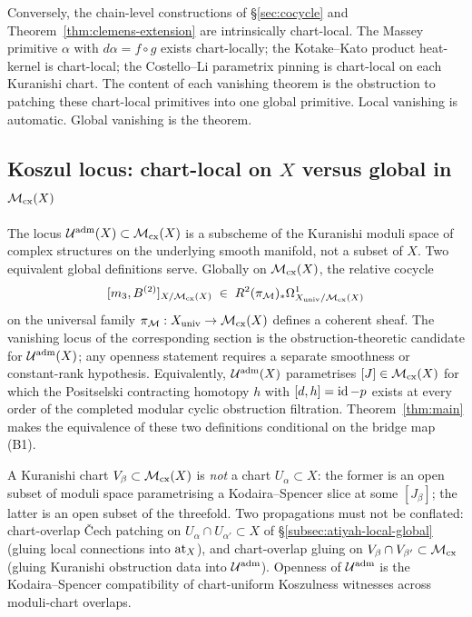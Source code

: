Conversely, the chain-level constructions of §\ref{sec:cocycle} and Theorem~\ref{thm:clemens-extension} are intrinsically chart-local. The Massey primitive $\alpha$ with $d\alpha = f \circ g$ exists chart-locally; the Kotake--Kato product heat-kernel is chart-local; the Costello--Li parametrix pinning is chart-local on each Kuranishi chart. The content of each vanishing theorem is the obstruction to patching these chart-local primitives into one global primitive. Local vanishing is automatic. Global vanishing is the theorem.

\subsection{Koszul locus: chart-local on $X$ versus global in $\mathcal{M}_{\mathrm{cx}}(X)$}
\label{subsec:koszul-scope}

The locus $\mathcal{U}^{\mathrm{adm}}(X) \subset \mathcal{M}_{\mathrm{cx}}(X)$ is a subscheme of the Kuranishi moduli space of complex structures on the underlying smooth manifold, not a subset of $X$. Two equivalent global definitions serve. Globally on $\mathcal{M}_{\mathrm{cx}}(X)$, the relative cocycle
\[
  [m_3, B^{(2)}]_{X/\mathcal{M}_{\mathrm{cx}}(X)} \;\in\; R^2 (\pi_{\mathcal{M}})_* \Omega^1_{X_{\mathrm{univ}}/\mathcal{M}_{\mathrm{cx}}(X)}
\]
on the universal family $\pi_{\mathcal{M}} : X_{\mathrm{univ}} \to \mathcal{M}_{\mathrm{cx}}(X)$ defines a coherent sheaf. The vanishing locus of the corresponding section is the obstruction-theoretic candidate for $\mathcal{U}^{\mathrm{adm}}(X)$; any openness statement requires a separate smoothness or constant-rank hypothesis. Equivalently, $\mathcal{U}^{\mathrm{adm}}(X)$ parametrises $[J] \in \mathcal{M}_{\mathrm{cx}}(X)$ for which the Positselski contracting homotopy $h$ with $[d, h] = \operatorname{id} - p$ exists at every order of the completed modular cyclic obstruction filtration. Theorem~\ref{thm:main} makes the equivalence of these two definitions conditional on the bridge map \textup{(B1)}.

A Kuranishi chart $V_\beta \subset \mathcal{M}_{\mathrm{cx}}(X)$ is \emph{not} a chart $U_\alpha \subset X$: the former is an open subset of moduli space parametrising a Kodaira--Spencer slice at some $[J_\beta]$; the latter is an open subset of the threefold. Two propagations must not be conflated: chart-overlap Čech patching on $U_\alpha \cap U_{\alpha'} \subset X$ of §\ref{subsec:atiyah-local-global} (gluing local connections into $\mathrm{at}_X$), and chart-overlap gluing on $V_\beta \cap V_{\beta'} \subset \mathcal{M}_{\mathrm{cx}}$ (gluing Kuranishi obstruction data into $\mathcal{U}^{\mathrm{adm}}$). Openness of $\mathcal{U}^{\mathrm{adm}}$ is the Kodaira--Spencer compatibility of chart-uniform Koszulness witnesses across moduli-chart overlaps.

